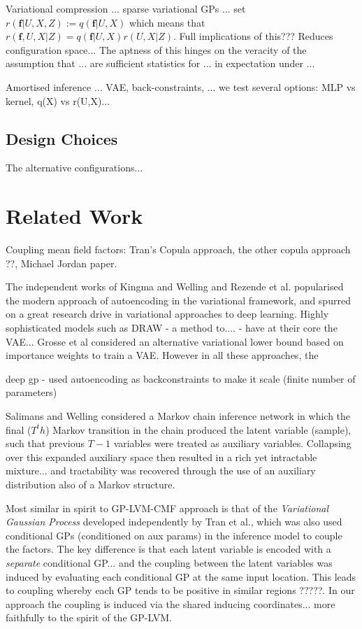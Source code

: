 \documentclass[]{article}
\newcommand{\fb}{\mathbf{f}}
\begin{document}
Variational compression ... sparse variational GPs ... set $r(\fb|U,X,Z):=q(\fb|U,X)$ which means that $r(\fb,U,X|Z) = q(\fb|U,X)r(U,X|Z)$.
Full implications of this??? Reduces configuration space...
The aptness of this hinges on the veracity of the assumption that ... are sufficient statistics for ... in expectation under ...

Amortised inference ... VAE, back-constraints, ... we test several options: MLP vs kernel, q(X) vs r(U,X)...

\subsection{Design Choices}\label{subsec:choices}

The alternative configurations...

\section{Related Work}\label{sec:related}

Coupling mean field factors: Tran's Copula approach, the other copula approach ??, Michael Jordan paper.

The independent works of Kingma and Welling and Rezende et al. popularised the modern approach of autoencoding in the variational framework, and spurred on a great research drive in variational approaches to deep learning.
Highly sophisticated models such as DRAW - a method to.... - have at their core the VAE... Grosse et al considered an alternative variational lower bound based on importance weights to train a VAE.
However in all these approaches, the

deep gp - used autoencoding as backconstraints to make it scale (finite number of parameters)

Salimans and Welling considered a Markov chain inference network in which the final ($T^th$) Markov transition in the chain produced the latent variable (sample), such that previous $T-1$ variables were treated as auxiliary variables.
Collapsing over this expanded auxiliary space then resulted in a rich yet intractable mixture... and tractability was recovered through the use of an auxiliary distribution also of a Markov structure.

Most similar in spirit to GP-LVM-CMF approach is that of the \emph{Variational Gaussian Process} developed independently by Tran et al., which was also used conditional GPs (conditioned on aux params) in the inference model to couple the factors.
The key difference is that each latent variable is encoded with a \emph{separate} conditional GP... and the coupling between the latent variables was induced by evaluating each conditional GP at the same input location.
This leads to coupling whereby each GP tends to be positive in similar regions ?????.
In our approach the coupling is induced via the shared inducing coordinates... more faithfully to the spirit of the GP-LVM.
\end{document}
